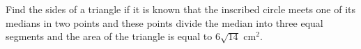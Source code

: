 Find the sides of a triangle if it is known that the inscribed circle meets one of its medians in two points and these points divide the median into three equal segments and the area of the triangle is equal to $6\sqrt{14}\text{ cm}^2$.